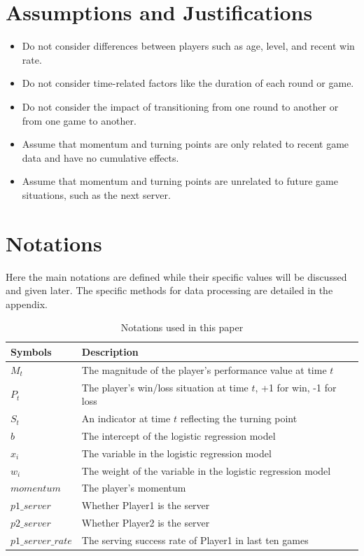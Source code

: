 \documentclass[UTF8]{ctexart} %
\begin{document}
\section{\textbf{Assumptions and Justifications}}
\begin{itemize}
    \item Do not consider differences between players such as age, level, and recent win rate.
    \item Do not consider time-related factors like the duration of each round or game. 
    \item Do not consider the impact of transitioning from one round to another or from one game to another.
    \item Assume that momentum and turning points are only related to recent game data and have no cumulative effects.
    \item Assume that momentum and turning points are unrelated to future game situations, such as the next server.
\end{itemize}


\section{Notations}
Here the main notations are defined while their specific values will be discussed and given later. The specific methods for data processing are detailed in the appendix. 
\begin{table}[H] %
    \caption{Notations used in this paper}
    \begin{tabularx}{\textwidth}{XX}
    \toprule
    \textbf{Symbols} & \textbf{Description}\\
    \midrule
        $M_t$ & The magnitude of the player's performance value at time \(t\) \\
        $P_t$ & The player's win/loss situation at time \(t\), +1 for win, -1 for loss \\
        $S_t$ & An indicator at time \(t\) reflecting the turning point \\
        $b$ & The intercept of the logistic regression model \\
        $x_i$ & The variable in the logistic regression model \\
        $w_i$ & The weight of the variable in the logistic regression model \\
        $momentum$ & The player's momentum \\
        $p1\_server$ & Whether Player1 is the server \\
        $p2\_server$ & Whether Player2 is the server \\
        $p1\_server\_rate$ & The serving success rate of Player1 in last ten games \\
    \bottomrule
    \end{tabularx}
\end{table}
\end{document}
